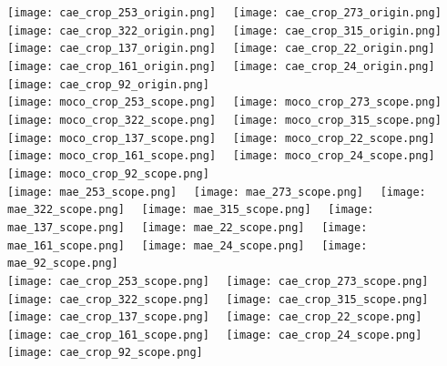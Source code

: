 \documentclass[twocolumn]{svjour3}          \smartqed  \usepackage{graphicx}
\begin{document}
\begin{figure*}[t]
\centering
\footnotesize
\texttt{[image: cae\_crop\_253\_origin.png]}~~
\texttt{[image: cae\_crop\_273\_origin.png]}~~
\texttt{[image: cae\_crop\_322\_origin.png]}~~
\texttt{[image: cae\_crop\_315\_origin.png]}~~
\texttt{[image: cae\_crop\_137\_origin.png]}~~
\texttt{[image: cae\_crop\_22\_origin.png]}~~
\texttt{[image: cae\_crop\_161\_origin.png]}~~
\texttt{[image: cae\_crop\_24\_origin.png]}~~
\texttt{[image: cae\_crop\_92\_origin.png]}~~
\\
\vspace{1mm}
\texttt{[image: moco\_crop\_253\_scope.png]}~~
\texttt{[image: moco\_crop\_273\_scope.png]}~~
\texttt{[image: moco\_crop\_322\_scope.png]}~~
\texttt{[image: moco\_crop\_315\_scope.png]}~~
\texttt{[image: moco\_crop\_137\_scope.png]}~~
\texttt{[image: moco\_crop\_22\_scope.png]}~~
\texttt{[image: moco\_crop\_161\_scope.png]}~~
\texttt{[image: moco\_crop\_24\_scope.png]}~~
\texttt{[image: moco\_crop\_92\_scope.png]}~~
\\
\vspace{1mm}
\texttt{[image: mae\_253\_scope.png]}~~
\texttt{[image: mae\_273\_scope.png]}~~
\texttt{[image: mae\_322\_scope.png]}~~
\texttt{[image: mae\_315\_scope.png]}~~
\texttt{[image: mae\_137\_scope.png]}~~
\texttt{[image: mae\_22\_scope.png]}~~
\texttt{[image: mae\_161\_scope.png]}~~
\texttt{[image: mae\_24\_scope.png]}~~
\texttt{[image: mae\_92\_scope.png]}~~
\\
\vspace{1mm}
\texttt{[image: cae\_crop\_253\_scope.png]}~~
\texttt{[image: cae\_crop\_273\_scope.png]}~~
\texttt{[image: cae\_crop\_322\_scope.png]}~~
\texttt{[image: cae\_crop\_315\_scope.png]}~~
\texttt{[image: cae\_crop\_137\_scope.png]}~~
\texttt{[image: cae\_crop\_22\_scope.png]}~~
\texttt{[image: cae\_crop\_161\_scope.png]}~~
\texttt{[image: cae\_crop\_24\_scope.png]}~~
\texttt{[image: cae\_crop\_92\_scope.png]}~~

\end{figure*}
\end{document}
